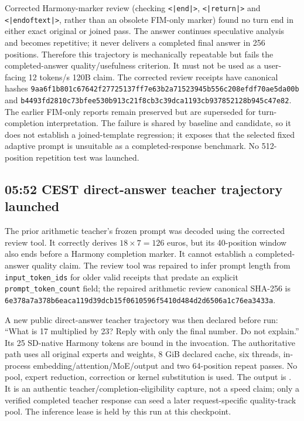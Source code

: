 Corrected Harmony-marker review (checking \texttt{<|end|>},
\texttt{<|return|>} and \texttt{<|endoftext|>}, rather than an obsolete
FIM-only marker) found no turn end in either exact original or joined pass.
The answer continues speculative analysis and becomes repetitive; it never
delivers a completed final answer in 256 positions. Therefore this trajectory
is mechanically repeatable but fails the completed-answer quality/usefulness
criterion. It must not be used as a user-facing 12 tokens/s 120B claim.
The corrected review receipts have canonical hashes
\texttt{9aa6f1b801c67642f27725137ff7e63b2a71523945b556c208efdf70ae5da00b}
and \texttt{b4493fd2810c73bfee530b913c21f8cb3c39dca1193cb937852128b945c47e82}.
The earlier FIM-only reports remain preserved but are superseded for
turn-completion interpretation. The failure is shared by baseline and
candidate, so it does not establish a joined-template regression; it exposes
that the selected fixed adaptive prompt is unsuitable as a completed-response
benchmark. No 512-position repetition test was launched.

\subsection{05:52 CEST direct-answer teacher trajectory launched}
The prior arithmetic teacher's frozen prompt was decoded using the corrected
review tool. It correctly derives $18\times7=126$ euros, but its 40-position
window also ends before a Harmony completion marker. It cannot establish a
completed-answer quality claim. The review tool was repaired to infer prompt
length from \texttt{input\_token\_ids} for older valid receipts that predate
an explicit \texttt{prompt\_token\_count} field; the repaired arithmetic
review canonical SHA-256 is
\texttt{6e378a7a378b6eaca119d39dcb15f0610596f5410d484d2d6506a1c76ea3433a}.

A new public direct-answer teacher trajectory was then declared before run:
``What is 17 multiplied by 23? Reply with only the final number. Do not
explain.'' Its 25 SD-native Harmony tokens are bound in the invocation.
The authoritative path uses all original experts and weights, 8 GiB declared
cache, six threads, in-process embedding/attention/MoE/output and two
64-position repeat passes. No pool, expert reduction, correction or kernel
substitution is used. The output is
.
It is an authentic teacher/completion-eligibility capture, not a speed claim;
only a verified completed teacher response can seed a later request-specific
quality-track pool. The inference lease is held by this run at this checkpoint.

